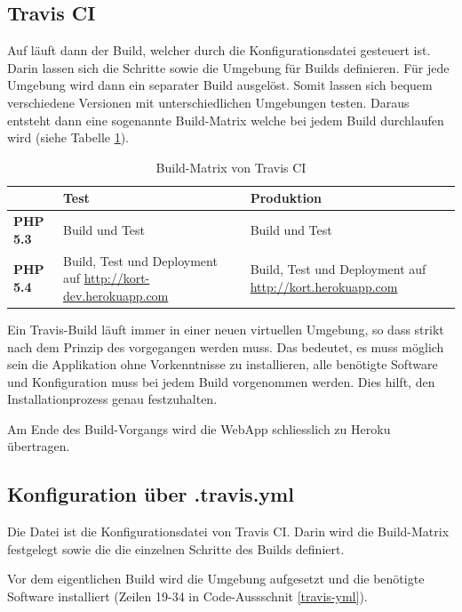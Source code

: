 \subsection{Travis CI}
Auf  läuft dann der Build, welcher durch die Konfigurationsdatei  gesteuert ist. Darin lassen sich die Schritte sowie die Umgebung für Builds definieren.
Für jede Umgebung wird dann ein separater Build ausgelöst.
Somit lassen sich bequem verschiedene Versionen mit unterschiedlichen Umgebungen testen.
Daraus entsteht dann eine sogenannte Build-Matrix welche bei jedem Build durchlaufen wird (siehe Tabelle \ref{infrastruktur-build-matrix}).

\begin{table}[H]
\centering
\begin{tabular}{|p{0.15\threecelltabwidth}|p{0.425\threecelltabwidth}|p{0.425\threecelltabwidth}|}
\hline 
 & \textbf{Test} & \textbf{Produktion} \\
\hline 
\textbf{PHP 5.3} & Build und Test & Build und Test \\
\hline 
\textbf{PHP 5.4} & Build, Test und Deployment auf \url{http://kort-dev.herokuapp.com} & Build, Test und Deployment auf \url{http://kort.herokuapp.com} \\
\hline 
\end{tabular} 
\caption{Build-Matrix von Travis CI}
\label{infrastruktur-build-matrix}
\end{table}

Ein Travis-Build läuft immer in einer neuen virtuellen Umgebung, so dass strikt nach dem Prinzip des \emph{} vorgegangen werden muss.
Das bedeutet, es muss möglich sein die Applikation ohne Vorkenntnisse zu installieren, alle benötigte Software und Konfiguration muss bei jedem Build vorgenommen werden.
Dies hilft, den Installationprozess genau festzuhalten.

Am Ende des Build-Vorgangs wird die \gls{WebApp} schliesslich zu Heroku übertragen.

\subsection{Konfiguration über .travis.yml}
Die  Datei ist die Konfigurationsdatei von Travis CI.
Darin wird die Build-Matrix festgelegt sowie die die einzelnen Schritte des Builds definiert.

Vor dem eigentlichen Build wird die Umgebung aufgesetzt und die benötigte Software installiert (Zeilen 19-34 in Code-Aussschnit \ref{travis-yml}).

